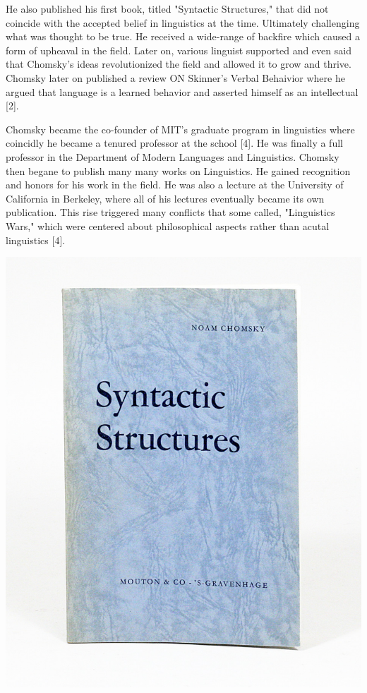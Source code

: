 \documentclass[conference]{IEEEtran}
\begin{document}
He also published his first book, titled "Syntactic Structures," that did not coincide with the accepted belief in linguistics at the time. Ultimately challenging what was thought to be true. He received a wide-range of backfire which caused a form of upheaval in the field. Later on, various linguist supported and even said that Chomsky's ideas revolutionized the field and allowed it to grow and thrive. Chomsky later on published a review ON Skinner's Verbal Behaivior where he argued that language is a learned behavior and asserted himself as an intellectual [2].

Chomsky became the co-founder of MIT's graduate program in linguistics where coincidly he became a tenured professor at the school [4]. He was finally a full professor in the Department of Modern Languages and Linguistics. Chomsky then begane to publish many many works on Linguistics. He gained recognition and honors for his work in the field. He was also a lecture at the University of California in Berkeley, where all of his lectures eventually became its own publication. This rise triggered many conflicts that some called, "Linguistics Wars," which were centered about philosophical aspects rather than acutal linguistics [4]. \newline


\includegraphics[scale=.2]{ss.jpg} 
\end{document}

